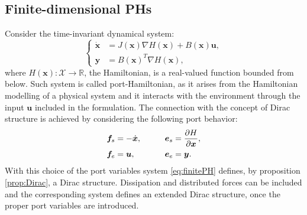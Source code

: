\documentclass[11t]{article}
\begin{document}
{		\subsection{Finite-dimensional PHs}
		Consider the time-invariant dynamical system:
		\begin{equation}
		\label{eq:finitePH}
		\begin{cases}
		\dot{ \bm{x} } &= J(\bm{x}) \nabla H(\bm{x}) + B(\bm{x})\bm{u}, \\
		\bm{y} &= B(\bm{x})^T \nabla H(\bm{x}),
		\end{cases}
		\end{equation}
		where $ H(\bm{x}) : \mathcal{X} \rightarrow \mathbb{R} $, the Hamiltonian, is a real-valued function bounded from below. Such system is called port-Hamiltonian, as it arises from the Hamiltonian modelling of a physical system and it interacts with the environment through the input $\bm{u}$ included in the formulation. The connection with the concept of Dirac structure is achieved by considering the following port behavior:
		\begin{equation}
		\begin{aligned}
		\bm{f}_s &= - \dot{ \bm{x} }, \qquad 
		&\bm{e}_s &= \diffp{H}{\bm{x}}, \\
		\bm{f}_e &= \bm{u}, \qquad
		&\bm{e}_e &= \bm{y}. \\
		\end{aligned}
		\end{equation}
		With this choice of the port variables system \eqref{eq:finitePH} defines, by proposition \ref{prop:Dirac}, a Dirac structure. Dissipation and distributed forces can be included and the corresponding system defines an extended Dirac structure, once the proper port variables are introduced.
}
\end{document}

